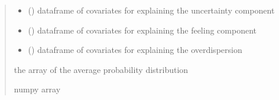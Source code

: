 \documentclass[letterpaper,10pt,english]{sphinxmanual}
\begin{document}
\begin{fulllineitems}
\begin{quote}
\begin{description}
\begin{itemize}
\item {} 
\sphinxAtStartPar
{} () \textendash{} dataframe of covariates for explaining the uncertainty component

\item {} 
\sphinxAtStartPar
{} () \textendash{} dataframe of covariates for explaining the feeling component

\item {} 
\sphinxAtStartPar
{} () \textendash{} dataframe of covariates for explaining the overdispersion

\end{itemize}

\sphinxAtStartPar
the array of the average probability distribution

\sphinxAtStartPar
numpy array

\end{description}\end{quote}

\end{fulllineitems}

\end{document}
